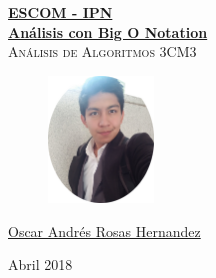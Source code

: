 \documentclass[12pt, fleqn]{article}                            %
\author{Oscar Andrés Rosas}                                     %
\theoremstyle{break}                                            %
\begin{document}
\begin{titlepage}
    
    \pagecolor{TitlePageColor}                                      %
    \color{white}                                                   %

    \vspace                                                         %
    \baselineskip                                                   %

    \makebox[0pt][l]{\rule{1.3\textwidth}{3pt}}                     %
    
    \href{https://compilandoconocimiento.com/}                      %
    {\textbf{\textsc{\Huge ESCOM - IPN}}}\\[2.7cm]                  %

    \href{https://github.com/CompilandoConocimiento/}               %
    {\fontsize{65}{78}\selectfont 
        \textbf{Análisis con Big O Notation}}\\[0.5cm]              %
    \textcolor{ColorSubtext}
        {\textsc{\Huge Análisis de Algoritmos 3CM3}}\\[2cm]         %
    
    \vfill                                                          %

    \begin{figure}[h]
        \includegraphics[width=0.25\textwidth]{Photo}
    \end{figure}
    
    \href{ProjectAuthorLink}                                        %
    {\LARGE \textsf{Oscar Andrés Rosas Hernandez}}                  %

    \vspace                                                         %
    \baselineskip                                                   %
    
    {\large \textsf{Abril 2018}}                                    %

\end{titlepage}
\end{document}
